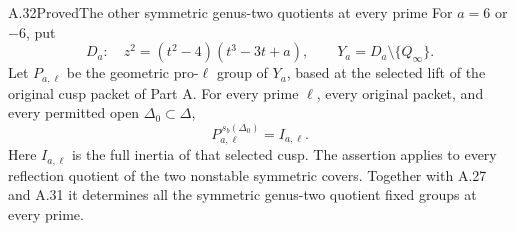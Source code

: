 \begin{statement}{A.32}{Proved}{The other symmetric genus-two quotients at every prime}
For \(a=6\) or \(-6\), put
\[
 D_a:\quad z^2=(t^2-4)(t^3-3t+a),\qquad
 Y_a=D_a\setminus\{Q_\infty\}.
\]
Let \(P_{a,\ell}\) be the geometric pro-\(\ell\) group of
\(Y_a\), based at the selected lift of the original cusp
packet of Part A. For every prime \(\ell\), every original
packet, and every permitted open \(\Delta_0\subset\Delta\),
\[
             P_{a,\ell}^{\,s_b(\Delta_0)}=I_{a,\ell}.
                                                        \tag{A.32.1}
\]
Here \(I_{a,\ell}\) is the full inertia of that selected cusp.
The assertion applies to every reflection quotient of the two
nonstable symmetric covers. Together with A.27 and A.31 it
determines all the symmetric genus-two quotient fixed groups
at every prime.
\end{statement}
